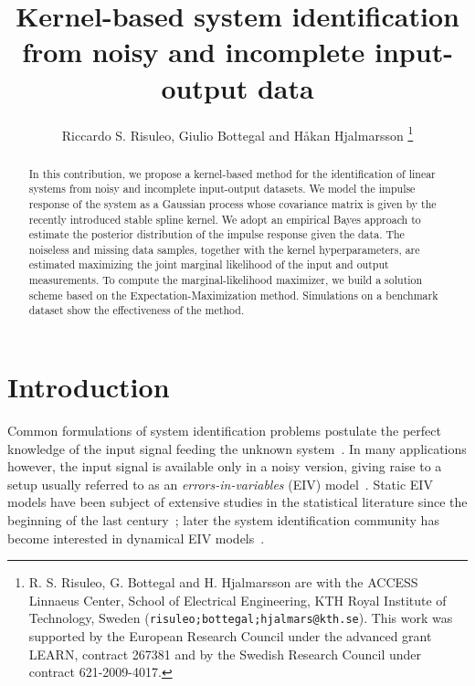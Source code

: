 \documentclass[10pt]{article}
\begin{document}
\title{\LARGE \bf Kernel-based system identification\\ from noisy and
  incomplete input-output data}
\author{Riccardo S. Risuleo, Giulio Bottegal and H\r akan Hjalmarsson
  \thanks{R. S. Risuleo, G. Bottegal and H. Hjalmarsson are with the ACCESS
    Linnaeus Center, School of Electrical Engineering, KTH Royal Institute of
    Technology, Sweden ({\tt \small risuleo;bottegal;hjalmars@kth.se}).  This
    work was supported by the European Research Council under the advanced
    grant LEARN, contract 267381 and by the Swedish Research Council under
    contract 621-2009-4017.  }} \maketitle


\begin{abstract}
  In this contribution, we propose a kernel-based method for the identification
  of linear systems from noisy and incomplete input-output datasets. We model
  the impulse response of the system as a Gaussian process whose covariance
  matrix is given by the recently introduced stable spline kernel. We adopt an
  empirical Bayes approach to estimate the posterior distribution of the impulse
  response given the data.  The noiseless and missing data samples, together
  with the kernel hyperparameters, are estimated maximizing the joint marginal
  likelihood of the input and output measurements. To compute the
  marginal-likelihood maximizer, we build a solution scheme based on the
  Expectation-Maximization method. Simulations on a benchmark dataset show the
  effectiveness of the method.
\end{abstract}

\section{Introduction}
Common formulations of system identification problems postulate the perfect
knowledge of the input signal feeding the unknown system~\cite{ljung1999system}.
In many applications however, the input signal is available only in a noisy
version, giving raise to a setup usually referred to as an
\emph{errors-in-variables} (EIV) model~\cite{soederstroem2007errors}.  Static
EIV models have been subject of extensive studies in the statistical literature
since the beginning of the last century~\cite{frisch1934statistical}; later the
system identification community has become interested in dynamical EIV
models~\cite{anderson1985identification,fernando1985identification,soederstroem2007errors}.
\end{document}
